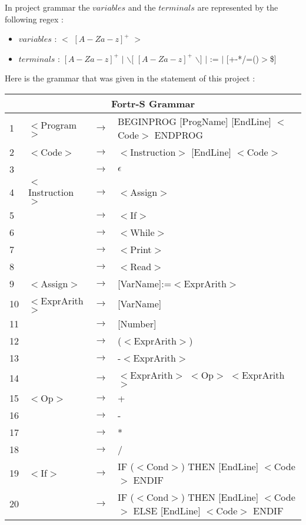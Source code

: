 \documentclass{article}
\begin{document}
\noindent In project grammar the $variables$ and the $terminals$ are represented by the following regex :
\begin{itemize}
    \item $variables$ : $<$ $[A-Za-z] ^ +$ $>$
    \item $terminals$ : $ [A-Za-z] ^ +$ $|$ $\backslash [$ $[A-Za-z] ^ +$ $\backslash ]$ $|$ := $|$  [+-*/=()$>$\$]\\
\end{itemize}
\noindent Here is the grammar that was given in the statement of this project :
\begin{center}
\begin{tabular}{|m{0.5cm} m{2cm} m{0.5cm} m{10cm}|}
\hline
\multicolumn{4}{|c|}{Fortr-S Grammar}\\
\hline\hline
1 & $<$Program$>$ & $\to$ & BEGINPROG [ProgName] [EndLine] $<$Code$>$ ENDPROG \\

2 & $<$Code$>$ & $\to$ & $<$Instruction$>$ [EndLine] $<$Code$>$ \\
3 & & $\to$ & $\epsilon$ \\

4 & $<$Instruction$>$ & $\to$ & $<$Assign$>$\\
5 & & $\to$ & $<$If$>$\\
6 & & $\to$ & $<$While$>$\\
7 & & $\to$ & $<$Print$>$\\
8 & & $\to$ & $<$Read$>$\\

9 & $<$Assign$>$ & $\to$ & [VarName]:=$<$ExprArith$>$\\

10 & $<$ExprArith$>$ & $\to$ & [VarName]\\
11 & & $\to$ & [Number]\\
12 & & $\to$ & ($<$ExprArith$>$)\\
13 & & $\to$ & -$<$ExprArith$>$\\
14 & & $\to$ & $<$ExprArith$>$ $<$Op$>$ $<$ExprArith$>$\\

15 & $<$Op$>$ & $\to$ & + \\
16 & & $\to$ & -\\
17 & & $\to$ & *\\
18 & & $\to$ & /\\

19 & $<$If$>$ & $\to$ & IF ($<$Cond$>$) THEN [EndLine] $<$Code$>$ ENDIF\\
20 & & $\to$ & IF ($<$Cond$>$) THEN [EndLine] $<$Code$>$ ELSE [EndLine] $<$Code$>$ ENDIF\\


\end{tabular}
\end{center}
\end{document}

